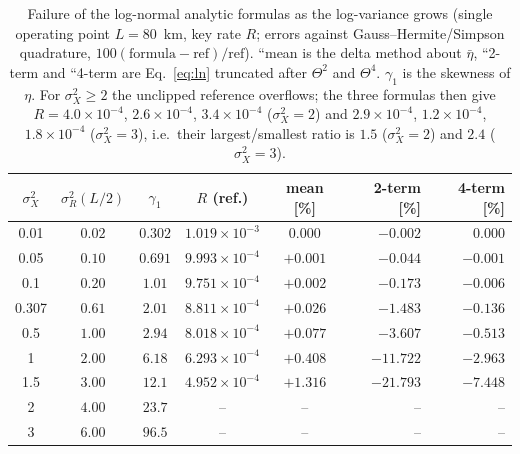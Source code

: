 \begin{table}[htbp]
\centering\small
\caption{Failure of the log-normal analytic formulas as the log-variance grows (single operating point $L=80$~km, key rate $R$; errors against Gauss--Hermite/Simpson quadrature, $100(\text{formula}-\text{ref})/\text{ref}$). ``mean is the delta method about $\bar\eta$, ``2-term and ``4-term are Eq.~\eqref{eq:ln} truncated after $\Theta^2$ and $\Theta^4$. $\gamma_1$ is the skewness of $\eta$. For $\sigma_X^2\ge2$ the unclipped reference overflows; the three formulas then give $R=4.0\times10^{-4}$, $2.6\times10^{-4}$, $3.4\times10^{-4}$ ($\sigma_X^2=2$) and $2.9\times10^{-4}$, $1.2\times10^{-4}$, $1.8\times10^{-4}$ ($\sigma_X^2=3$), i.e.\ their largest/smallest ratio is $1.5$ ($\sigma_X^2=2$) and $2.4$ ($\sigma_X^2=3$).}
\label{tab:stress}
\begin{tabular}{cccccrr}
\toprule
$\sigma_X^2$ & $\sigma_R^2(L/2)$ & $\gamma_1$ & $R$ (ref.) & mean [\%] & 2-term [\%] & 4-term [\%]\\
\midrule
0.01 & $0.02$ & $0.302$ & $1.019\times10^{-3}$ & $0.000$ & $-0.002$ & $0.000$ \\
0.05 & $0.10$ & $0.691$ & $9.993\times10^{-4}$ & $+0.001$ & $-0.044$ & $-0.001$ \\
0.1 & $0.20$ & $1.01$ & $9.751\times10^{-4}$ & $+0.002$ & $-0.173$ & $-0.006$ \\
0.307 & $0.61$ & $2.01$ & $8.811\times10^{-4}$ & $+0.026$ & $-1.483$ & $-0.136$ \\
0.5 & $1.00$ & $2.94$ & $8.018\times10^{-4}$ & $+0.077$ & $-3.607$ & $-0.513$ \\
1 & $2.00$ & $6.18$ & $6.293\times10^{-4}$ & $+0.408$ & $-11.722$ & $-2.963$ \\
1.5 & $3.00$ & $12.1$ & $4.952\times10^{-4}$ & $+1.316$ & $-21.793$ & $-7.448$ \\
2 & $4.00$ & $23.7$ & -- & -- & -- & -- \\
3 & $6.00$ & $96.5$ & -- & -- & -- & -- \\

\bottomrule
\end{tabular}
\end{table}

